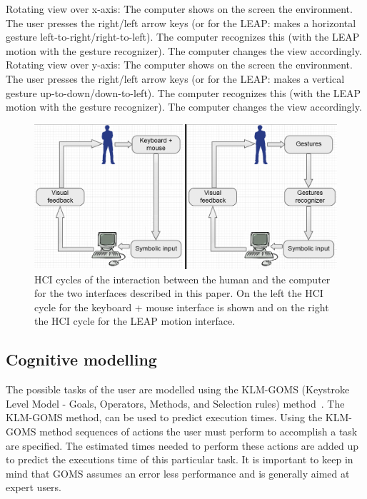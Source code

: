 \newline\newline
Rotating view over x-axis: 
\newline The computer shows on the screen the environment. The user presses the right/left arrow keys (or for the LEAP: makes a horizontal gesture left-to-right/right-to-left). The computer recognizes this (with the LEAP motion with the gesture recognizer). The computer changes the view accordingly.
\newline\newline
Rotating view over y-axis: 
\newline The computer shows on the screen the environment. The user presses the right/left arrow keys (or for the LEAP: makes a vertical gesture up-to-down/down-to-left). The computer recognizes this (with the LEAP motion with the gesture recognizer). The computer changes the view accordingly.

\begin{figure}[H]
\includegraphics[width=\textwidth]{imgs/HCIcycles.png}
\caption{\label{fig:HCIcycles}HCI cycles of the interaction between the human and the computer for the two interfaces described in this paper. On the left the HCI cycle for the keyboard + mouse interface is shown and on the right the HCI cycle for the LEAP motion interface.}
\end{figure}

\subsection{Cognitive modelling}
The possible tasks of the user are modelled using the KLM-GOMS (Keystroke Level Model - Goals, Operators, Methods, and Selection rules) method~\cite{john1996goms}. The KLM-GOMS method, can be used to predict execution times. Using the KLM-GOMS method sequences of actions the user must perform to accomplish a task are specified. The estimated times needed to perform these actions are added up to predict the executions time of this particular task. It is important to keep in mind that GOMS assumes an error less performance and is generally aimed at expert users.

